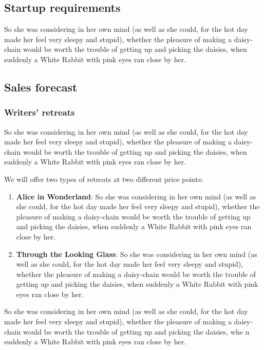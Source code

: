 \documentclass[12pt]{article}
\begin{document}
\subsection{Startup requirements}
\label{sec:orgheadline42}
So she was considering in her own mind (as well as she could, for the hot day made her feel very sleepy and stupid), whether the pleasure of making a daisy-chain would be worth the trouble of getting up and picking the daisies, when suddenly a White Rabbit with pink eyes ran close by her. 

\subsection{Sales forecast}
\label{sec:orgheadline44}
\subsubsection{Writers' retreats}
\label{sec:orgheadline43}
So she was considering in her own mind (as well as she could, for the hot day made her feel very sleepy and stupid), whether the pleasure of making a daisy-chain would be worth the trouble of getting up and picking the daisies, when suddenly a White Rabbit with pink eyes ran close by her. 

We will offer two types of retreats at two different price points: 
\begin{enumerate}
\item \textbf{Alice in Wonderland}: So she was considering in her own mind (as well as she could, for the hot day made her feel very sleepy and stupid), whether the pleasure of making a daisy-chain would be worth the trouble of getting up and picking the daisies, when suddenly a White Rabbit with pink eyes ran close by her.
\item \textbf{Through the Looking Glass}: So she was considering in her own mind (as well as she could, for the hot day made her feel very sleepy and stupid), whether the pleasure of making a daisy-chain would be worth the trouble of getting up and picking the daisies, when suddenly a White Rabbit with pink eyes ran close by her.
\end{enumerate}

So she was considering in her own mind (as well as she could, for the hot day made her feel very sleepy and stupid), whether the pleasure of making a daisy-chain would be worth the trouble of getting up and picking the daisies, whe n suddenly a White Rabbit with pink eyes ran close by her. 
\end{document}
